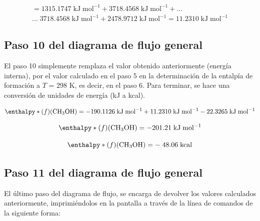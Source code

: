 \begin{multline}
	[H(298.15)-H(0)]= 1315.1747\;\mathrm{kJ\;mol^{-1}} + 3718.4568\;\mathrm{kJ\;mol^{-1}} +...\\...\; 3718.4568\;\mathrm{kJ\;mol^{-1}} + 2478.9712\;\mathrm{kJ\;mol^{-1}} = \mathrm{11.2310\;kJ\;mol^{-1}}
\label{eq:4.22}
\end{multline}

\newpage

\subsection{Paso 10 del diagrama de flujo general}

El paso 10 simplemente remplaza el valor obtenido anteriormente (energía interna), por el valor calculado en el paso 5 en la determinación de la entalpía de formación a $T$ = 298 K, es decir, en el paso 6. Para terminar, se hace una conversión de unidades de energía (kJ a kcal).


\begin{equation}
	\enthalpy*(f){}\mathrm{(CH_3OH) = -190.1126\;\mathrm{kJ\;mol^{-1}} + 11.2310\;\mathrm{kJ\;mol^{-1}} - 22.3265\;kJ\;mol^{-1}}
\label{eq:4.23}
\end{equation}

\begin{equation}
	\enthalpy*(f){}\mathrm{(CH_3OH) = -201.21\;kJ\;mol^{-1}}
\label{eq:4.24}
\end{equation}


\begin{equation}
	\enthalpy*(f){}\mathrm{(CH_3OH) = -\;48.06\;kcal}
\label{eq:4.25}
\end{equation}

\newpage

\subsection{Paso 11 del diagrama de flujo general}
El último paso del diagrama de flujo, se encarga de devolver los valores calculados anteriormente, imprimiéndolos en la pantalla a través de la línea de comandos de la siguiente forma:

